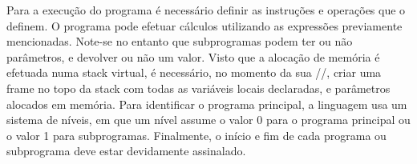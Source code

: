 Para a execução do programa é necessário definir as instruções e operações que o definem. O programa pode efetuar cálculos utilizando as expressões previamente mencionadas. Note-se no entanto que subprogramas podem ter ou não parâmetros, e devolver ou não um valor. Visto que a alocação de memória é efetuada numa stack virtual, é necessário, no momento da sua //, criar uma frame no topo da stack com todas as variáveis locais declaradas, e parâmetros alocados em memória. Para identificar o programa principal, a linguagem usa um sistema de níveis, em que um nível assume o valor 0 para o programa principal ou o valor 1 para subprogramas. Finalmente, o início e fim de cada programa ou subprograma deve estar devidamente assinalado.  

   




 



